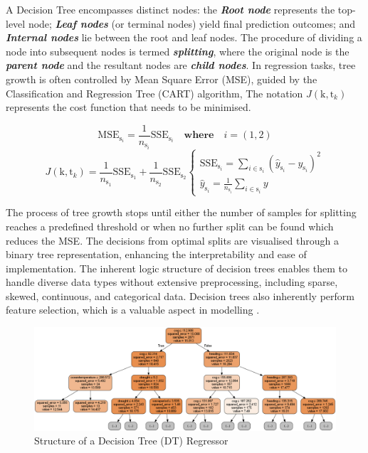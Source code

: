 \documentclass[]{interact}
\theoremstyle{plain}%
\theoremstyle{definition}
\theoremstyle{remark}
\begin{document}
A Decision Tree encompasses distinct nodes: the \textbf{\emph{Root node}} represents the top-level node; \textbf{\emph{Leaf nodes}} (or terminal nodes) yield final prediction outcomes; and \textbf{\emph{Internal nodes}} lie between the root and leaf nodes. The procedure of dividing a node into subsequent nodes is termed \textbf{\emph{splitting}}, where the original node is the \textbf{\emph{parent node}} and the resultant nodes are \textbf{\emph{child nodes}}. In regression tasks, tree growth is often controlled by Mean Square Error (MSE), guided by the Classification and Regression Tree (CART) algorithm, The notation $J(\text{k},\text{t}_k)$ represents the cost function that needs to be minimised.

\begin{equation}\label{eqn:sse}
  \text{MSE}_{\text{s}_i} = \frac{1}{n_{\text{s}_i}}\text{SSE}_{\text{s}_i} \quad \textbf{where} \quad i = (1,2)   
\end{equation}
\begin{equation}\label{eqn:costfun}
  J(\text{k},\text{t}_k) = \frac{1}{n_{\text{s}_1}}\text{SSE}_{\text{s}_1} + \frac{1}{n_{\text{s}_2}}\text{SSE}_{\text{s}_2}
  \begin{cases}
      \text{SSE}_{\text{s}_i} = \sum\limits_{i \in \text{s}_i}(\hat{y}_{\text{s}_i} - y_{\text{s}_i} )^2 \\
      \hat{y}_{\text{s}_i} = \frac{1}{n_{\text{s}_i}}\sum\limits_{i\in \text{s}_i} y
  \end{cases}  
\end{equation}

The process of tree growth stops until either the number of samples for splitting reaches a predefined threshold or when no further split can be found which reduces the MSE. The decisions from optimal splits are visualised through a binary tree representation, enhancing the interpretability and ease of implementation. The inherent logic structure of decision trees enables them to handle diverse data types without extensive preprocessing, including sparse, skewed, continuous, and categorical data. Decision trees also inherently perform feature selection, which is a valuable aspect in modelling \citep{Kuhn.2013}.\\

\begin{figure}
  \label{fig:dtr_tree_trained}
  \centering
  \includegraphics[width=.9\textwidth]{00_figures/dtr_mod_1tree.png}
  \caption{Structure of a Decision Tree (DT) Regressor}
\end{figure}
\end{document}
